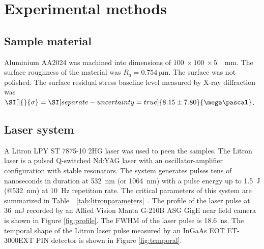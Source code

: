 \documentclass[sn-nature]{sn-jnl}%
\theoremstyle{thmstyleone}%
\theoremstyle{thmstyletwo}%
\theoremstyle{thmstylethree}%
\begin{document}

\section{Experimental methods}\label{sec:methods}


    \subsection{Sample material}
    Aluminium AA2024 was machined into dimensions of \(\SI[]{100}{} \times \SI[]{100}{} \times \SI[]{5}{}\) \SI[]{}{\mm}. The surface roughness of the material was \( R_a  = \SI[]{0.754}{\micro\metre} \). The surface was not polished.  The surface residual stress baseline level measured by X-ray diffraction was  \( \SI[]{}{\sigma}  = \SI[separate-uncertainty = true]{8.15 \pm 7.80 }{\mega\pascal} \).


    \subsection{Laser system}

    A Litron LPY ST 7875-10 2HG laser was used to peen the samples. The Litron laser is a pulsed Q-switched Nd:YAG laser with an oscillator-amplifier configuration with stable resonators. The system generates pulses tens of nanoseconds in duration at \SI{532}{\nano\meter} (or \SI{1064}{\nano\meter}) with a pulse energy up to \SI{1.5}{\joule } (@\SI{532}{\nano\meter}) at \SI{10}{\hertz} repetition rate. The critical parameters of this system are summarized in Table~~\ref{tab:litronparameters}~\cite{litron}.  The profile of the laser pulse at \SI{36}{\milli\joule} recorded by an Allied Vision Manta G-210B ASG GigE near field camera is shown in Figure \ref{fig:profile}. The FWHM of the laser pulse is \SI{18.6}{\ns}. The temporal shape of the Litron laser pulse measured by an InGaAs EOT ET-3000EXT PIN detector is shown in Figure \ref{fig:temporal}.
\end{document}
